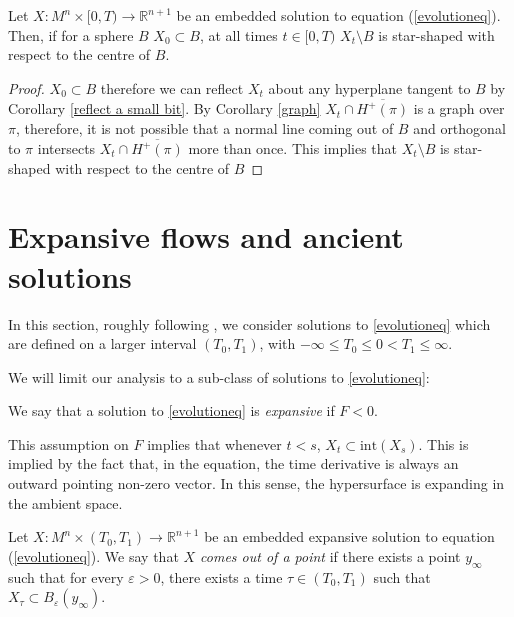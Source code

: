 \begin{cor}
	Let $ X : M^n \times [0, T) \to \mathbb{R}^{n+1} $ be an embedded solution to equation (\ref{evolutioneq}). Then, if for a sphere $B$ $X_0\subset B$, at all times $t \in [0, T)$ $X_t\setminus B$ is star-shaped with respect to the centre of $B$.
\end{cor}

\begin{proof}
	 $X_0\subset B$ therefore we can reflect $X_t$ about any hyperplane tangent to $B$ by Corollary \ref{reflect a small bit}. By Corollary \ref{graph} $X_t\cap\overline{H^+(\pi)}$ is a graph over $\pi$, therefore, it is not possible that a normal line coming out of $B$ and orthogonal to $\pi$ intersects  $X_t\cap\overline{H^+(\pi)}$ more than once. This implies that  $X_t\setminus B$ is star-shaped with respect to the centre of $B$
\end{proof}

\section{Expansive flows and ancient solutions}

In this section, roughly following \cite{SinestRisa}, we consider solutions to \ref{evolutioneq} which are defined on a larger interval $(T_0, T_1)$, with  $-\infty \leq T_0 \leq 0 < T_1 \leq \infty$. 

We will limit our analysis to a sub-class of solutions to \ref{evolutioneq}:
\begin{defin}
	We say that a solution to \ref{evolutioneq} is {\em expansive} if $F<0$. 
\end{defin}
\begin{oss}	
	This assumption on $F$ implies that whenever $t<s$, $X_t \subset \mathrm{int}(X_s)$. This is implied by the fact that, in the equation, the time derivative is always an outward pointing non-zero vector.\label{expansive flow remark} In this sense, the hypersurface is expanding in the ambient space.
\end{oss}
\begin{defin}
	Let $ X : M^n \times (T_0, T_1) \to \mathbb{R}^{n+1} $ be an embedded expansive solution to equation (\ref{evolutioneq}). We say that {\em $X$ comes out of a point} if there exists a point $y_\infty$ such that for every $\varepsilon>0$, there exists a time $\tau \in  (T_0, T_1)$ such that $X_\tau \subset B_\varepsilon(y_\infty)$.
\end{defin}

